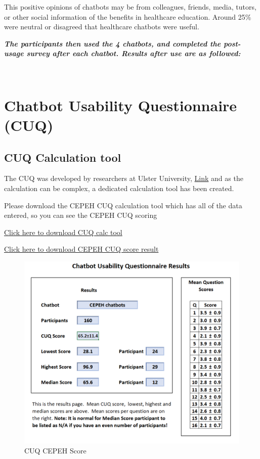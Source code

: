 \documentclass[a4paper, nobind]{templates/ociamthesis}
\begin{document}
This positive opinions of chatbots may be from colleagues, friends, media, tutors, or other social information of the benefits in healthcare education. Around 25\% were neutral or disagreed that healthcare chatbots were useful.

\textbf{\emph{The participants then used the 4 chatbots, and completed the
post-usage survey after each chatbot. Results after use are as
followed:}}

\strut \\

\hypertarget{chatbot-usability-questionnaire-cuq-1}{%
\section{Chatbot Usability Questionnaire (CUQ)}\label{chatbot-usability-questionnaire-cuq-1}}

\hypertarget{cuq-calculation-tool}{%
\subsection{CUQ Calculation tool}\label{cuq-calculation-tool}}

The CUQ was developed by researchers at Ulster University,
\href{https://www.ulster.ac.uk/research/topic/computer-science/artificial-intelligence/projects/cuq}{Link}
and as the calculation can be complex, a dedicated calculation tool has been created.

Please download the CEPEH CUQ calculation tool which has all of the data entered, so you can see the CEPEH CUQ scoring

\href{CUQ-Calculation-Tool.xlsx}{Click here to download CUQ calc tool}

\href{cuq.png}{Click here to download CEPEH CUQ score result}

\begin{figure}

{\centering \includegraphics[width=0.75\linewidth]{cuq} 

}

\caption{CUQ CEPEH Score}\label{fig:cuqimage}
\end{figure}
\end{document}
